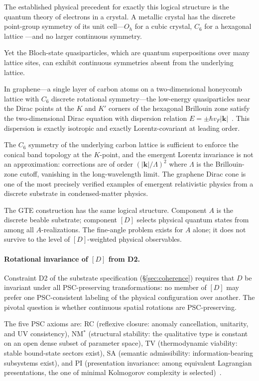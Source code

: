\documentclass[12pt,letterpaper]{article}
\newcommand{\Dclass}{[D]}
\begin{document}
The established physical precedent for exactly this logical structure is the quantum
theory of electrons in a crystal.  A metallic crystal has the discrete point-group
symmetry of its unit cell---$O_h$ for a cubic crystal, $C_6$ for a hexagonal lattice
---and no larger continuous symmetry.

Yet the Bloch-state quasiparticles, which are quantum superpositions over many lattice
sites, can exhibit continuous symmetries absent from the underlying lattice.

In graphene---a single layer of carbon atoms on a two-dimensional honeycomb lattice
with $C_6$ discrete rotational symmetry---the low-energy quasiparticles near the
Dirac points at the $K$ and $K'$ corners of the hexagonal Brillouin zone satisfy the
two-dimensional Dirac equation with dispersion relation
$E = \pm\hbar v_F|\mathbf{k}|$~\cite{CastroNeto2009}.  This dispersion is exactly
isotropic and exactly Lorentz-covariant at leading order.

The $C_6$ symmetry of the underlying carbon lattice is sufficient to enforce the
conical band topology at the $K$-point, and the emergent Lorentz invariance is not an
approximation: corrections are of order $(|\mathbf{k}|/\Lambda)^2$ where $\Lambda$
is the Brillouin-zone cutoff, vanishing in the long-wavelength limit.  The graphene
Dirac cone is one of the most precisely verified examples of emergent relativistic
physics from a discrete substrate in condensed-matter physics.

The GTE construction has the same logical structure.  Component $A$ is the discrete
beable substrate; component $\Dclass$ selects physical quantum states from among all
$A$-realizations.  The fine-angle problem exists for $A$ alone; it does not survive
to the level of $\Dclass$-weighted physical observables.

\paragraph{Rotational invariance of $\Dclass$ from D2.}

Constraint D2 of the substrate specification (\S\ref{sec:coherence}) requires that
$D$ be invariant under all PSC-preserving transformations: no member of $\Dclass$
may prefer one PSC-consistent labeling of the physical configuration over another.
The pivotal question is whether continuous spatial rotations are PSC-preserving.

The five PSC axioms are: RC (reflexive closure: anomaly cancellation, unitarity,
and UV consistency), NM$^*$ (structural stability: the qualitative type is constant
on an open dense subset of parameter space), TV (thermodynamic viability: stable
bound-state sectors exist), SA (semantic admissibility: information-bearing
subsystems exist), and PI (presentation invariance: among equivalent Lagrangian
presentations, the one of minimal Kolmogorov complexity is selected)~\cite{SpivackNEMS05}.
\end{document}
